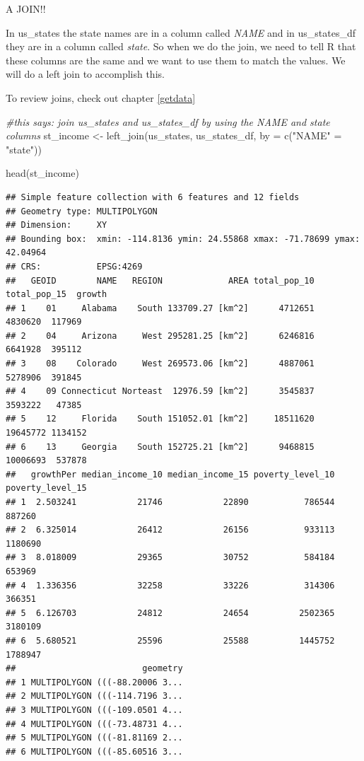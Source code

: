 \documentclass[
]{book}
\newenvironment{Shaded}{\begin{snugshade}}{\end{snugshade}}
\newcommand{\AttributeTok}[1]{\textcolor[rgb]{0.77,0.63,0.00}{#1}}
\newcommand{\CommentTok}[1]{\textcolor[rgb]{0.56,0.35,0.01}{\textit{#1}}}
\newcommand{\FunctionTok}[1]{\textcolor[rgb]{0.00,0.00,0.00}{#1}}
\newcommand{\NormalTok}[1]{#1}
\newcommand{\OtherTok}[1]{\textcolor[rgb]{0.56,0.35,0.01}{#1}}
\newcommand{\StringTok}[1]{\textcolor[rgb]{0.31,0.60,0.02}{#1}}
\begin{document}
A JOIN!!

In us\_states the state names are in a column called \emph{NAME} and in us\_states\_df they are in a column called \emph{state}. So when we do the join, we need to tell R that these columns are the same and we want to use them to match the values. We will do a left join to accomplish this.

To review joins, check out chapter \ref{getdata}

\begin{Shaded}
\begin{Highlighting}[]
\CommentTok{\#this says: join us\_states and us\_states\_df by using the NAME and state columns}
\NormalTok{st\_income }\OtherTok{\textless{}{-}} \FunctionTok{left\_join}\NormalTok{(us\_states, us\_states\_df, }\AttributeTok{by =} \FunctionTok{c}\NormalTok{(}\StringTok{"NAME"} \OtherTok{=} \StringTok{"state"}\NormalTok{))}

\FunctionTok{head}\NormalTok{(st\_income)}
\end{Highlighting}
\end{Shaded}

\begin{verbatim}
## Simple feature collection with 6 features and 12 fields
## Geometry type: MULTIPOLYGON
## Dimension:     XY
## Bounding box:  xmin: -114.8136 ymin: 24.55868 xmax: -71.78699 ymax: 42.04964
## CRS:           EPSG:4269
##   GEOID        NAME   REGION             AREA total_pop_10 total_pop_15  growth
## 1    01     Alabama    South 133709.27 [km^2]      4712651      4830620  117969
## 2    04     Arizona     West 295281.25 [km^2]      6246816      6641928  395112
## 3    08    Colorado     West 269573.06 [km^2]      4887061      5278906  391845
## 4    09 Connecticut Norteast  12976.59 [km^2]      3545837      3593222   47385
## 5    12     Florida    South 151052.01 [km^2]     18511620     19645772 1134152
## 6    13     Georgia    South 152725.21 [km^2]      9468815     10006693  537878
##   growthPer median_income_10 median_income_15 poverty_level_10 poverty_level_15
## 1  2.503241            21746            22890           786544           887260
## 2  6.325014            26412            26156           933113          1180690
## 3  8.018009            29365            30752           584184           653969
## 4  1.336356            32258            33226           314306           366351
## 5  6.126703            24812            24654          2502365          3180109
## 6  5.680521            25596            25588          1445752          1788947
##                         geometry
## 1 MULTIPOLYGON (((-88.20006 3...
## 2 MULTIPOLYGON (((-114.7196 3...
## 3 MULTIPOLYGON (((-109.0501 4...
## 4 MULTIPOLYGON (((-73.48731 4...
## 5 MULTIPOLYGON (((-81.81169 2...
## 6 MULTIPOLYGON (((-85.60516 3...
\end{verbatim}
\end{document}
